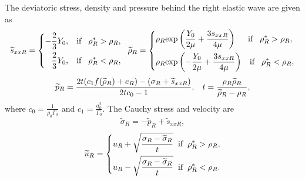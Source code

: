 \documentclass[review]{elsarticle}
\begin{document}
The deviatoric stress, density and pressure behind the right elastic wave are given as
\begin{equation}
  \widetilde{s}_{xxR} =\left\{ \begin{aligned}
      -\frac{2}{3}Y_0, \hspace{0.3cm} \text{if} \hspace{0.3cm} \rho_R^* > \rho_R,\\
      \frac{2}{3}Y_0, \hspace{0.3cm} \text{if} \hspace{0.3cm} \rho_R^* < \rho_R,\\
    \end{aligned}\right.
    \hspace{0.2cm} \widetilde{\rho}_{R} = \left\{ \begin{aligned}
      & \rho_R \text{exp}\left(\frac{Y_0}{2\mu}+\frac{3 s_{xxR}}{4\mu}\right)  \hspace{0.5cm} \text{if} \hspace{0.3cm} \rho_R^* > \rho_R,\\
& \rho_R \text{exp}\left(-\frac{Y_0}{2\mu}+\frac{3 s_{xxR}}{4\mu}\right)
\hspace{0.3cm} \text{if} \hspace{0.3cm} \rho_R^* < \rho_R,\\
  \end{aligned}\right.
 \end{equation}
\begin{equation}
  \widetilde{p}_R= \frac{2t(c_1f(\widetilde{\rho}_R)+e_R)-(\sigma_R+\widetilde{s}_{xxR})}{2tc_0-1}, \hspace{0.3cm}
t=\frac{\rho_R \widetilde{\rho}_R}{\widetilde{\rho}_R-\rho_R},
\end{equation}
where $c_0 =\frac{1}{\rho_0 \Gamma_0}$ and $c_1 = \frac{a_0^2}{\Gamma_0}$.
The Cauchy stress and velocity are
\begin{equation}
\widetilde{\sigma}_R = -\widetilde{p}_R+\widetilde{s}_{xxR},
\end{equation}
\begin{equation}
  \widetilde{u}_R= \left\{
  \begin{aligned}
    u_R+\sqrt{\frac{\sigma_R-\widetilde{\sigma}_R}{t}} \hspace{0.2cm} \text{if} \hspace{0.2cm} \rho_R^* >\rho_R,\\
    u_R-\sqrt{\frac{\sigma_R-\widetilde{\sigma}_R}{t}} \hspace{0.2cm} \text{if} \hspace{0.2cm} \rho_R^* <\rho_R.\\
\end{aligned} \right.
\end{equation}
\end{document}
